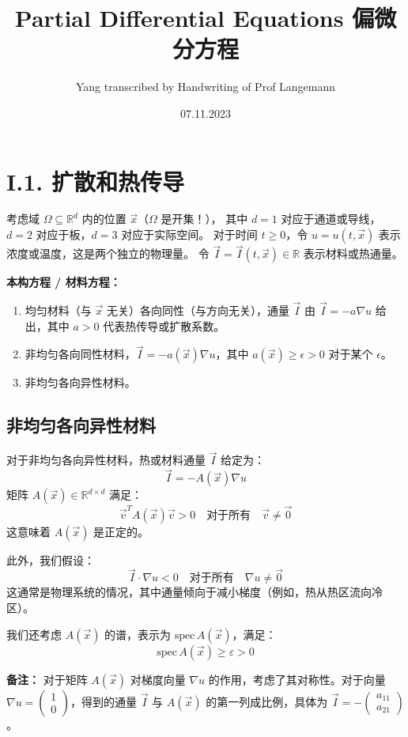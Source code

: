 \documentclass{ctexart}
\title{Partial Differential Equations 偏微分方程}
\author{Yang transcribed by Handwriting of Prof Langemann}
\date{07.11.2023}
\begin{document}
\maketitle


\section*{I.1. 扩散和热传导}
考虑域 \( \Omega \subseteq \mathbb{R}^d \) 内的位置 \( \vec{x} \)（\( \Omega \) 是开集！），
其中 \( d=1 \) 对应于通道或导线，\( d=2 \) 对应于板，\( d=3 \) 对应于实际空间。
对于时间 \( t \geq 0 \)，令 \( u = u(t, \vec{x}) \) 表示浓度或温度，这是两个独立的物理量。
令 \( \vec{I} = \vec{I}(t,\vec{x}) \in \mathbb{R} \) 表示材料或热通量。

\textbf{本构方程 / 材料方程：}
\begin{enumerate}
\item 均匀材料（与 \( \vec{x} \) 无关）各向同性（与方向无关），通量 \( \vec{I} \) 由 \( \vec{I} = -a \nabla u \) 给出，其中 \( a > 0 \) 代表热传导或扩散系数。
\item 非均匀各向同性材料，\( \vec{I} = -a(\vec{x}) \nabla u \)，其中 \( a(\vec{x}) \geq \epsilon > 0 \) 对于某个 \( \epsilon \)。
\item 非均匀各向异性材料。
\end{enumerate}

\subsection*{非均匀各向异性材料}

对于非均匀各向异性材料，热或材料通量 \( \vec{I} \) 给定为：
\[ \vec{I} = -A(\vec{x}) \nabla u \]
矩阵 \( A(\vec{x}) \in \mathbb{R}^{d \times d} \) 满足：
\[ \vec{v}^T A(\vec{x}) \vec{v} > 0 \quad \text{对于所有} \quad \vec{v} \neq \vec{0} \]
这意味着 \( A(\vec{x}) \) 是正定的。

此外，我们假设：
\[ \vec{I} \cdot \nabla u < 0 \quad \text{对于所有} \quad \nabla u \neq \vec{0} \]
这通常是物理系统的情况，其中通量倾向于减小梯度（例如，热从热区流向冷区）。

我们还考虑 \( A(\vec{x}) \) 的谱，表示为 \( \text{spec} \, A(\vec{x}) \)，满足：
\[ \text{spec} \, A(\vec{x}) \geq \varepsilon > 0 \]

\textbf{备注：}
对于矩阵 \( A(\vec{x}) \) 对梯度向量 \( \nabla u \) 的作用，考虑了其对称性。对于向量 \( \nabla u = \begin{pmatrix} 1 \\ 0 \end{pmatrix} \)，得到的通量 \( \vec{I} \) 与 \( A(\vec{x}) \) 的第一列成比例，具体为 \( \vec{I} = - \begin{pmatrix} a_{11} \\ a_{21} \end{pmatrix} \)。
\end{document}
